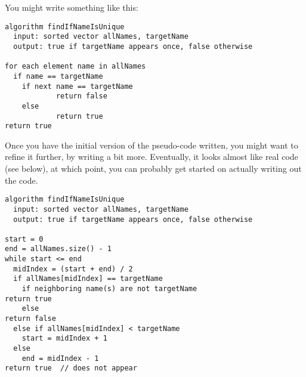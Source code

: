 \documentclass [12pt]{article}
\begin{document}
You might write something like this:

\begin{verbatim}
algorithm findIfNameIsUnique
  input: sorted vector allNames, targetName
  output: true if targetName appears once, false otherwise

for each element name in allNames
  if name == targetName
    if next name == targetName
            return false
    else
            return true
return true
\end{verbatim}

Once you have the initial version of the pseudo-code written, you might want to refine it further, by writing a bit more. Eventually, it looks almost like real code (see below), at which point, you can probably get started on actually writing out the code.

\begin{verbatim}
algorithm findIfNameIsUnique
  input: sorted vector allNames, targetName
  output: true if targetName appears once, false otherwise

start = 0
end = allNames.size() - 1
while start <= end
  midIndex = (start + end) / 2
  if allNames[midIndex] == targetName
    if neighboring name(s) are not targetName
return true
    else
return false
  else if allNames[midIndex] < targetName
    start = midIndex + 1
  else
    end = midIndex - 1
return true  // does not appear

\end{verbatim}
\end{document}
